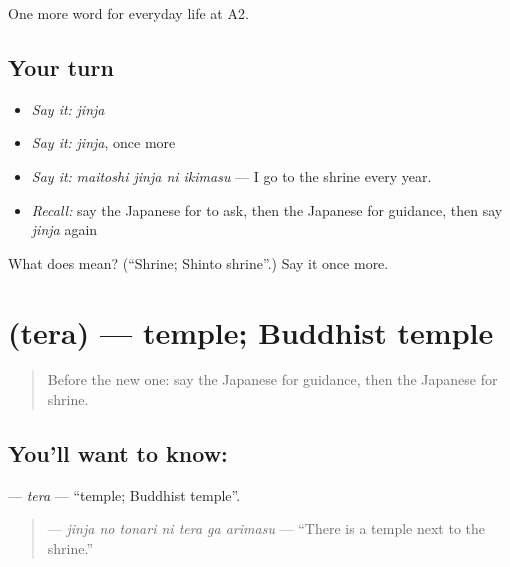 \begin{grammarlens}[title={What you've built}]
One more word for everyday life at A2.
\end{grammarlens}

\subsection*{Your turn}
\begin{itemize}
\raggedright
  \item \emph{Say it:} \emph{jinja}
  \item \emph{Say it:} \emph{jinja}, once more
  \item \emph{Say it:} \emph{maitoshi jinja ni ikimasu} — I go to the shrine every year.
  \item \emph{Recall:} say the Japanese for to ask, then the Japanese for guidance, then say \emph{jinja} again
\end{itemize}

\begin{tcolorbox}[breakable,colback=teal!4,colframe=teal!35!black,title={Before you move on}]
What does  mean? (\textquotedblleft{}Shrine; Shinto shrine\textquotedblright{}.) Say it once more.
\end{tcolorbox}
\section[\texorpdfstring{\ja{てら} (tera)}{てら (tera)}]{ (tera) — temple; Buddhist temple}

\label{lesson:JA-C193-tera}



\begin{quote}
Before the new one: say the Japanese for guidance, then the Japanese for shrine.
\end{quote}

\subsection*{You'll want to know: }
\textbf{} — \emph{tera} — \textquotedblleft{}temple; Buddhist temple\textquotedblright{}.

\begin{quote}
\textbf{   } — \emph{jinja no tonari ni tera ga arimasu} — \textquotedblleft{}There is a temple next to the shrine.\textquotedblright{}
\end{quote}

